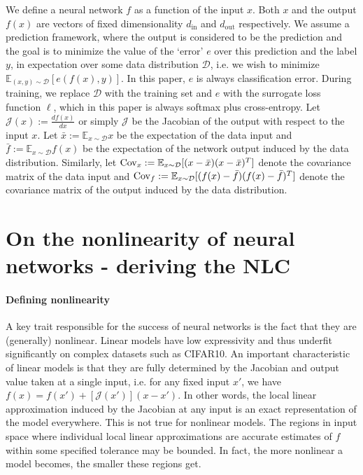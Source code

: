 \documentclass{article} %
\begin{document}
We define a neural network $f$ as a function of the input $x$. Both $x$ and the output $f(x)$ are vectors of fixed dimensionality $d_{\text{in}}$ and $d_{\text{out}}$ respectively. We assume a prediction framework, where the output is considered to be the prediction and the goal is to minimize the value of the `error' $e$ over this prediction and the label $y$, in expectation over some data distribution $\mathcal{D}$, i.e. we wish to minimize $\mathbb{E}_{(x,y)\sim \mathcal{D}}[e(f(x),y)]$. In this paper, $e$ is always classification error. During training, we replace $\mathcal{D}$ with the training set and $e$ with the surrogate loss function $\ell$, which in this paper is always softmax plus cross-entropy. Let $\mathcal{J}(x) := \frac{df(x)}{dx}$ or simply $\mathcal{J}$ be the Jacobian of the output with respect to the input $x$. Let $\bar{x} := \mathbb{E}_{x \sim \mathcal{D}} x$ be the expectation of the data input and $\bar{f} := \mathbb{E}_{x \sim \mathcal{D}} f(x)$ be the expectation of the network output induced by the data distribution. Similarly, let $\mathrm{Cov}_x := \mathbb{E}_{x \sim \mathcal{D}}[(x - \bar{x})(x - \bar{x})^T]$ denote the covariance matrix of the data input and $\mathrm{Cov}_f := \mathbb{E}_{x \sim \mathcal{D}}[(f(x) - \bar{f})(f(x) - \bar{f})^T]$ denote the covariance matrix of the output induced by the data distribution. 

\section{On the nonlinearity of neural networks - deriving the NLC} \label{derivationSection}


\paragraph{Defining nonlinearity} A key trait responsible for the success of neural networks is the fact that they are (generally) nonlinear. Linear models have low expressivity and thus underfit significantly on complex datasets such as \mbox{CIFAR10}. An important characteristic of linear models is that they are fully determined by the Jacobian and output value taken at a single input, i.e. for any fixed input $x'$, we have $f(x) = f(x') + [\mathcal{J}(x')](x - x')$. In other words, the local linear approximation induced by the Jacobian at any input is an exact representation of the model everywhere. This is not true for nonlinear models. The regions in input space where individual local linear approximations are accurate estimates of $f$ within some specified tolerance may be bounded. In fact, the more nonlinear a model becomes, the smaller these regions get.
\end{document}
